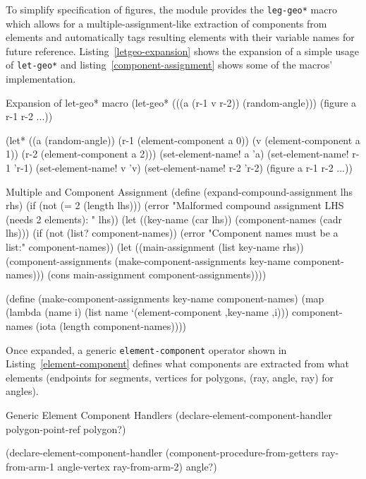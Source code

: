 To simplify specification of figures, the module provides the
\texttt{leg-geo*} macro which allows for a multiple-assignment-like
extraction of components from elements and automatically tags
resulting elements with their variable names for future
reference. Listing~\ref{letgeo-expansion} shows the expansion of a
simple usage of \texttt{let-geo*} and
listing~\ref{component-assignment} shows some of the macros' implementation.

\begin{code-example}
[label=letgeo-expansion]
{Expansion of let-geo* macro}
(let-geo* (((a (r-1 v r-2)) (random-angle)))
  (figure a r-1 r-2 ...))

(let* ((a (random-angle))
       (r-1 (element-component a 0))
       (v   (element-component a 1))
       (r-2 (element-component a 2)))
  (set-element-name! a   'a)
  (set-element-name! r-1 'r-1)
  (set-element-name! v   'v)
  (set-element-name! r-2 'r-2)
  (figure a r-1 r-2 ...))
\end{code-example}

\begin{code-listing}
[label=component-assignment]
{Multiple and Component Assignment}
(define (expand-compound-assignment lhs rhs)
  (if (not (= 2 (length lhs)))
      (error "Malformed compound assignment LHS (needs 2 elements): " lhs))
  (let ((key-name (car lhs))
        (component-names (cadr lhs)))
    (if (not (list? component-names))
        (error "Component names must be a list:" component-names))
    (let ((main-assignment (list key-name rhs))
          (component-assignments (make-component-assignments
                                  key-name
                                  component-names)))
      (cons main-assignment
            component-assignments))))

(define (make-component-assignments key-name component-names)
  (map (lambda (name i)
         (list name `(element-component ,key-name ,i)))
       component-names
       (iota (length component-names))))
\end{code-listing}

Once expanded, a generic \texttt{element-component} operator shown in
Listing~\ref{element-component} defines what components are extracted
from what elements (endpoints for segments, vertices for polygons,
(ray, angle, ray) for angles).

\begin{code-listing}
[label=element-component]
{Generic Element Component Handlers}
(declare-element-component-handler polygon-point-ref polygon?)

(declare-element-component-handler
 (component-procedure-from-getters
  ray-from-arm-1
  angle-vertex
  ray-from-arm-2)
 angle?)
\end{code-listing}

